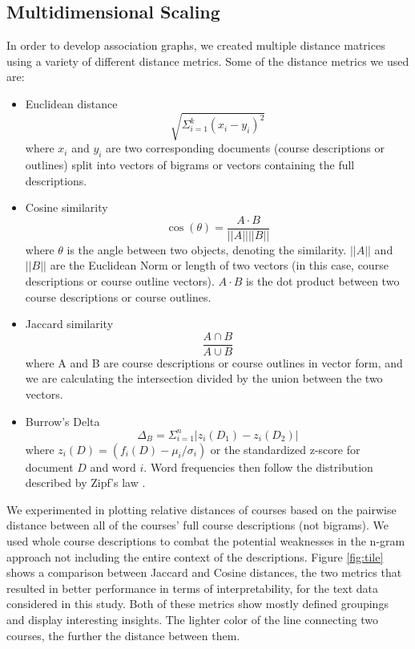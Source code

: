 \documentclass[11pt]{report}
\begin{document}
\subsection{Multidimensional Scaling}

In order to develop association graphs, we created multiple distance matrices using a variety of different distance metrics.  Some of the distance metrics we used are: 
\begin{itemize}
\item Euclidean distance  
$$\sqrt{\Sigma_{i = 1}^{k}(x_i - y_i)^2}$$
where $x_i$ and $y_i$ are two corresponding documents (course descriptions or outlines) split into vectors of bigrams or vectors containing the full descriptions.
\item Cosine similarity
$$ \cos (\theta) = \frac{A \cdot B}{|| A || || B||}$$
where $\theta$ is the angle between two objects, denoting the similarity.  $||A||$ and $||B||$ are the Euclidean Norm or length of two vectors (in this case, course descriptions or course outline vectors). $A \cdot B$ is the dot product  between two course descriptions or course outlines. 
\item Jaccard similarity  
$$\frac{A \cap B}{A \cup B}$$
where A and B are course descriptions or course outlines in vector form, and we are calculating the intersection divided by the union between the two vectors.
\item Burrow's Delta  \citep{burrow}
$$\Delta_B = \Sigma_{i = 1}^n | z_i(D_1) - z_i(D_2)|$$
where $z_i(D) = (f_i(D) - \mu_i/\sigma_i)$ or the standardized z-score for document $D$ and word $i$.  Word frequencies then follow the distribution described by Zipf's law \citep{zipf2013psycho}. 

\end{itemize} 

We experimented in plotting relative distances of courses based on the pairwise distance between all of the courses' full course descriptions (not bigrams).  We used whole course descriptions to combat the potential weaknesses in the n-gram approach not including the entire context of the descriptions.   Figure \ref{fig:tile} shows a comparison between Jaccard and Cosine distances, the two metrics that resulted in better performance in terms of interpretability,  for the text data considered in this study. Both of these metrics show mostly defined groupings and display interesting insights. The lighter color of the line connecting two courses, the further the distance between them.
\end{document}
